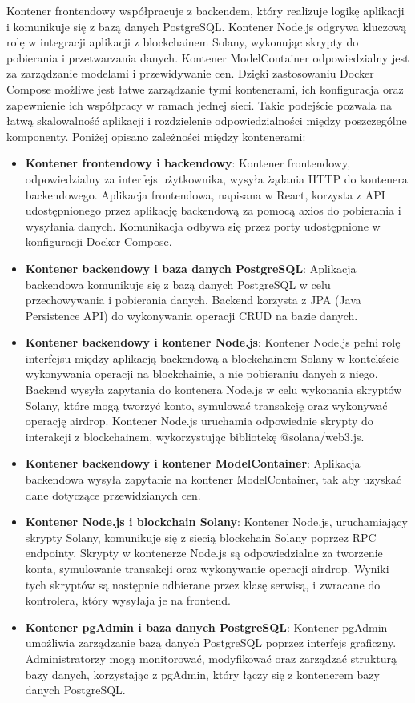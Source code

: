 Kontener frontendowy współpracuje z backendem, który realizuje logikę aplikacji i komunikuje się z bazą danych PostgreSQL. Kontener Node.js odgrywa kluczową rolę w integracji aplikacji z blockchainem Solany, wykonując skrypty do pobierania i przetwarzania danych. Kontener  ModelContainer odpowiedzialny jest za zarządzanie modelami i przewidywanie cen. Dzięki zastosowaniu Docker Compose możliwe jest łatwe zarządzanie tymi kontenerami, ich konfiguracja oraz zapewnienie ich współpracy w ramach jednej sieci. Takie podejście pozwala na łatwą skalowalność aplikacji i rozdzielenie odpowiedzialności między poszczególne komponenty. Poniżej opisano zależności między kontenerami:
\begin{itemize}
    \item \textbf{Kontener frontendowy i backendowy}: Kontener frontendowy, odpowiedzialny za interfejs użytkownika, wysyła żądania HTTP do kontenera backendowego. Aplikacja frontendowa, napisana w React, korzysta z API udostępnionego przez aplikację backendową za pomocą axios do pobierania i wysyłania danych. Komunikacja odbywa się przez porty udostępnione w konfiguracji Docker Compose.
    \item \textbf{Kontener backendowy i baza danych PostgreSQL}: Aplikacja backendowa komunikuje się z bazą danych PostgreSQL w celu przechowywania i pobierania danych. Backend korzysta z JPA (Java Persistence API) do wykonywania operacji CRUD na bazie danych.
    \item \textbf{Kontener backendowy i kontener Node.js}: Kontener Node.js pełni rolę interfejsu między aplikacją backendową a blockchainem Solany w kontekście wykonywania operacji na blockchainie, a nie pobieraniu danych z niego. Backend wysyła zapytania do kontenera Node.js w celu wykonania skryptów Solany, które mogą tworzyć konto, symulować transakcję oraz wykonywać operację airdrop. Kontener Node.js uruchamia odpowiednie skrypty do interakcji z blockchainem, wykorzystując bibliotekę @solana/web3.js.
		\item \textbf{Kontener backendowy i kontener ModelContainer}: Aplikacja backendowa wysyła zapytanie na kontener ModelContainer, tak aby uzyskać dane dotyczące przewidzianych cen. 
    \item \textbf{Kontener Node.js i blockchain Solany}: Kontener Node.js, uruchamiający skrypty Solany, komunikuje się z siecią blockchain Solany poprzez RPC endpointy. Skrypty w kontenerze Node.js są odpowiedzialne za tworzenie konta, symulowanie transakcji oraz wykonywanie operacji airdrop. Wyniki tych skryptów są następnie odbierane przez klasę serwisą, i zwracane do kontrolera, który wysyłaja je na frontend.
    \item \textbf{Kontener pgAdmin i baza danych PostgreSQL}: Kontener pgAdmin umożliwia zarządzanie bazą danych PostgreSQL poprzez interfejs graficzny. Administratorzy mogą monitorować, modyfikować oraz zarządzać strukturą bazy danych, korzystając z pgAdmin, który łączy się z kontenerem bazy danych PostgreSQL.
\end{itemize}

